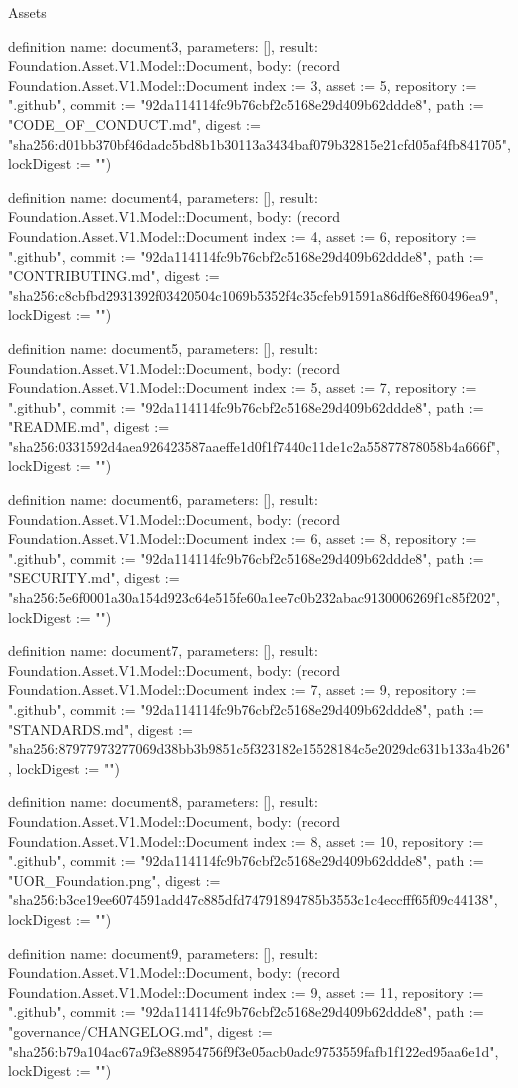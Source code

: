 \begin{lexlean}{Assets}
\begin{semanticmodule}
definition{
  name: document3,
  parameters: [],
  result: Foundation.Asset.V1.Model::Document,
  body: (record Foundation.Asset.V1.Model::Document {index := 3, asset := 5, repository := ".github", commit := "92da114114fc9b76cbf2c5168e29d409b62ddde8", path := "CODE_OF_CONDUCT.md", digest := "sha256:d01bb370bf46dadc5bd8b1b30113a3434baf079b32815e21cfd05af4fb841705", lockDigest := ""})
}

definition{
  name: document4,
  parameters: [],
  result: Foundation.Asset.V1.Model::Document,
  body: (record Foundation.Asset.V1.Model::Document {index := 4, asset := 6, repository := ".github", commit := "92da114114fc9b76cbf2c5168e29d409b62ddde8", path := "CONTRIBUTING.md", digest := "sha256:c8cbfbd2931392f03420504c1069b5352f4c35cfeb91591a86df6e8f60496ea9", lockDigest := ""})
}

definition{
  name: document5,
  parameters: [],
  result: Foundation.Asset.V1.Model::Document,
  body: (record Foundation.Asset.V1.Model::Document {index := 5, asset := 7, repository := ".github", commit := "92da114114fc9b76cbf2c5168e29d409b62ddde8", path := "README.md", digest := "sha256:0331592d4aea926423587aaeffe1d0f1f7440c11de1c2a55877878058b4a666f", lockDigest := ""})
}

definition{
  name: document6,
  parameters: [],
  result: Foundation.Asset.V1.Model::Document,
  body: (record Foundation.Asset.V1.Model::Document {index := 6, asset := 8, repository := ".github", commit := "92da114114fc9b76cbf2c5168e29d409b62ddde8", path := "SECURITY.md", digest := "sha256:5e6f0001a30a154d923c64e515fe60a1ee7c0b232abac9130006269f1c85f202", lockDigest := ""})
}

definition{
  name: document7,
  parameters: [],
  result: Foundation.Asset.V1.Model::Document,
  body: (record Foundation.Asset.V1.Model::Document {index := 7, asset := 9, repository := ".github", commit := "92da114114fc9b76cbf2c5168e29d409b62ddde8", path := "STANDARDS.md", digest := "sha256:87977973277069d38bb3b9851c5f323182e15528184c5e2029dc631b133a4b26", lockDigest := ""})
}

definition{
  name: document8,
  parameters: [],
  result: Foundation.Asset.V1.Model::Document,
  body: (record Foundation.Asset.V1.Model::Document {index := 8, asset := 10, repository := ".github", commit := "92da114114fc9b76cbf2c5168e29d409b62ddde8", path := "UOR_Foundation.png", digest := "sha256:b3ce19ee6074591add47c885dfd74791894785b3553c1c4eccfff65f09c44138", lockDigest := ""})
}

definition{
  name: document9,
  parameters: [],
  result: Foundation.Asset.V1.Model::Document,
  body: (record Foundation.Asset.V1.Model::Document {index := 9, asset := 11, repository := ".github", commit := "92da114114fc9b76cbf2c5168e29d409b62ddde8", path := "governance/CHANGELOG.md", digest := "sha256:b79a104ac67a9f3e88954756f9f3e05acb0adc9753559fafb1f122ed95aa6e1d", lockDigest := ""})
}


\end{semanticmodule}
\end{lexlean}
